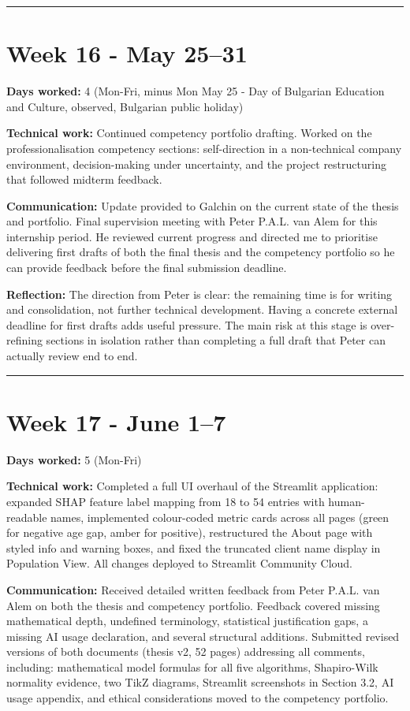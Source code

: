\documentclass[11pt,a4paper]{article}
\begin{document}
\noindent\rule{\textwidth}{0.4pt}


\section{Week 16  -  May 25–31}

\textbf{Days worked:} 4 (Mon-Fri, minus Mon May 25 - Day of Bulgarian Education and Culture, observed, Bulgarian public holiday)

\textbf{Technical work:} Continued competency portfolio drafting. Worked on the professionalisation competency sections: self-direction in a non-technical company environment, decision-making under uncertainty, and the project restructuring that followed midterm feedback.

\textbf{Communication:} Update provided to Galchin on the current state of the thesis and portfolio. Final supervision meeting with Peter P.A.L. van Alem for this internship period. He reviewed current progress and directed me to prioritise delivering first drafts of both the final thesis and the competency portfolio so he can provide feedback before the final submission deadline.

\textbf{Reflection:} The direction from Peter is clear: the remaining time is for writing and consolidation, not further technical development. Having a concrete external deadline for first drafts adds useful pressure. The main risk at this stage is over-refining sections in isolation rather than completing a full draft that Peter can actually review end to end.

\noindent\rule{\textwidth}{0.4pt}


\section{Week 17  -  June 1–7}

\textbf{Days worked:} 5 (Mon-Fri)

\textbf{Technical work:} Completed a full UI overhaul of the Streamlit application: expanded SHAP feature label mapping from 18 to 54 entries with human-readable names, implemented colour-coded metric cards across all pages (green for negative age gap, amber for positive), restructured the About page with styled info and warning boxes, and fixed the truncated client name display in Population View. All changes deployed to Streamlit Community Cloud.

\textbf{Communication:} Received detailed written feedback from Peter P.A.L. van Alem on both the thesis and competency portfolio. Feedback covered missing mathematical depth, undefined terminology, statistical justification gaps, a missing AI usage declaration, and several structural additions. Submitted revised versions of both documents (thesis v2, 52 pages) addressing all comments, including: mathematical model formulas for all five algorithms, Shapiro-Wilk normality evidence, two TikZ diagrams, Streamlit screenshots in Section 3.2, AI usage appendix, and ethical considerations moved to the competency portfolio.
\end{document}
